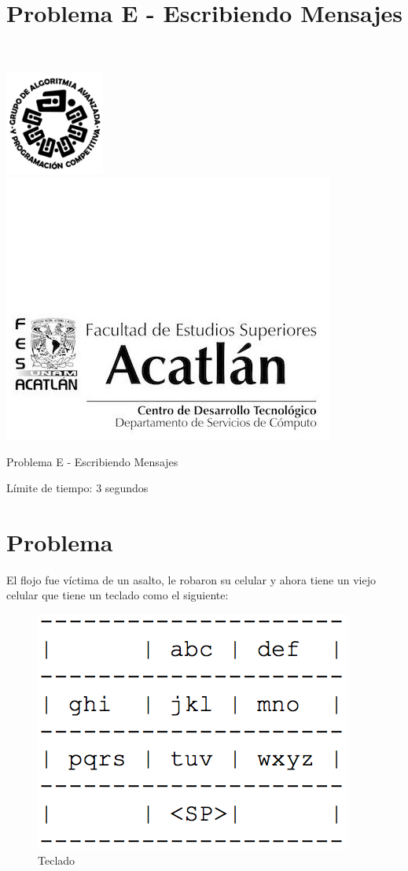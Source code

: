 \documentclass[letter,10pt]{article}
\date{}
\begin{document}
\title{Problema E - Escribiendo Mensajes}

\includegraphics[scale=0.6]{logo} \hspace*{9.00cm}
\includegraphics[scale=0.5]{dsc} 
\bigskip
\begin{center}
	\Large Problema E - Escribiendo Mensajes
\end{center}

\begin{flushright}
Límite de tiempo: 3 segundos
\par\end{flushright}
\bigskip

\section*{Problema}

El flojo fue víctima de un asalto, le robaron su celular y ahora tiene un viejo celular que tiene un teclado como el siguiente:

\begin{figure}[h!]
  \begin{center}
  	\includegraphics[scale=0.50]{mensaje}\caption{Teclado}
  \end{center} 
\end{figure}
\end{document}
